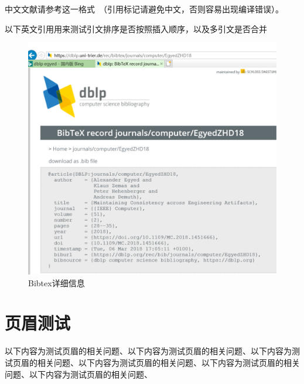 中文文献请参考这一格式~\cite{cyg2006}（引用标记请避免中文，否则容易出现编译错误）。

以下英文引用用来测试引文排序是否按照插入顺序，以及多引文是否合并~\cite{DBLP:journals/computer/EgyedZHD18, DBLP:journals/ml/TingZCZWZ19}

\begin{figure}[htb]
  \centering
  \includegraphics[width=5in]{FIGs/chapter7/bibtexDetail.pdf}
  \caption{Bibtex详细信息}\label{fig_bibtexDetailCH7}
\end{figure}

\section{页眉测试}
以下内容为测试页眉的相关问题、以下内容为测试页眉的相关问题、以下内容为测试页眉的相关问题、以下内容为测试页眉的相关问题、以下内容为测试页眉的相关问题、以下内容为测试页眉的相关问题、
